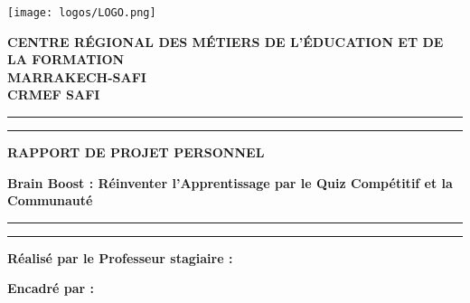 \documentclass[a4paper,11pt]{report}
\begin{document}
\begin{titlepage}
    \begin{center}
        \vspace*{-1cm}
        \texttt{[image: logos/LOGO.png]}
        \vspace{0.5cm}
        
        {\color{primary}\scshape\LARGE\bfseries 
        CENTRE R\'EGIONAL DES M\'ETIERS DE L'\'EDUCATION ET DE LA FORMATION\\[0.1cm]
        MARRAKECH-SAFI\\[0.1cm]
        {\Large CRMEF SAFI}}
        \vspace{0.8cm}
        
        {\color{primary}\rule{0.4\linewidth}{0.8mm}}
        \hfill
        {\color{primary}\rule{0.4\linewidth}{0.8mm}}
        
        \vspace{0.5cm}
        {\color{primary}\fontsize{22}{26}\selectfont\bfseries RAPPORT DE PROJET PERSONNEL}
        
        \vspace{0.7cm}
        
        \begin{center}
            {\color{primary}\fontsize{20}{24}\selectfont\bfseries Brain Boost : R\'einventer l'Apprentissage par le Quiz Comp\'etitif et la Communaut\'e}
        \end{center}

        \vspace{0.5cm}
        {\color{primary}\rule{0.4\linewidth}{0.8mm}}
        \hfill
        {\color{primary}\rule{0.4\linewidth}{0.8mm}}
        \vspace{1.2cm}
        
        \begin{center}
            \begin{minipage}{0.48\textwidth}
                \raggedright
                {\color{primary}\large\bfseries R\'ealis\'e par le Professeur stagiaire :}
            \end{minipage}%
            \begin{minipage}{0.48\textwidth}
                \raggedleft
                {\color{primary}\large\bfseries Encadr\'e par :}
            \end{minipage}
            

\end{center}
\end{center}
\end{titlepage}
\end{document}
